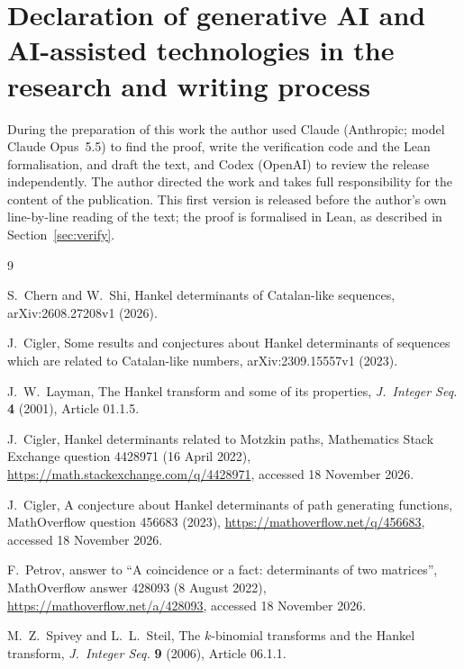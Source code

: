 \documentclass[11pt]{amsart}
\theoremstyle{definition}
\begin{document}
\section*{Declaration of generative AI and AI-assisted technologies in the research and writing process}
During the preparation of this work the author used Claude (Anthropic; model Claude Opus~5.5) to find the proof, write
the verification code and the Lean formalisation, and draft the text, and Codex (OpenAI) to review the release
independently. The author directed the work and takes full responsibility for the content of the publication. This
first version is released before the author's own line-by-line reading of the text; the proof is formalised in Lean, as
described in Section~\ref{sec:verify}.

\begin{thebibliography}{9}

 S.~Chern and W.~Shi, Hankel determinants of Catalan-like sequences, arXiv:2608.27208v1 (2026).

 J.~Cigler, Some results and conjectures about Hankel determinants of sequences which are related to
Catalan-like numbers, arXiv:2309.15557v1 (2023).

 J.~W.~Layman, The Hankel transform and some of its properties, \emph{J.\ Integer Seq.} \textbf{4} (2001),
Article 01.1.5.

 J.~Cigler, Hankel determinants related to Motzkin paths, Mathematics Stack Exchange question 4428971
(16 April 2022), \url{https://math.stackexchange.com/q/4428971}, accessed 18 November 2026.

 J.~Cigler, A conjecture about Hankel determinants of path generating functions, MathOverflow question
456683 (2023), \url{https://mathoverflow.net/q/456683}, accessed 18 November 2026.

 F.~Petrov, answer to ``A coincidence or a fact: determinants of two matrices'', MathOverflow answer 428093
(8 August 2022), \url{https://mathoverflow.net/a/428093}, accessed 18 November 2026.

 M.~Z.~Spivey and L.~L.~Steil, The $k$-binomial transforms and the Hankel transform, \emph{J.\ Integer
Seq.} \textbf{9} (2006), Article 06.1.1.

\end{thebibliography}
\end{document}
